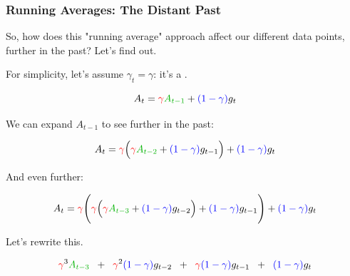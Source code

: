         \phantom{}

        \subsubsection{Running Averages: The Distant Past}

            So, how does this "running average" approach affect our different data points, further in the past? Let's find out.

            \phantom{}

            For simplicity, let's assume $\gamma_t=\gamma$: it's a .

            \begin{equation}
                A_t 
                =
                \red{\gamma} \grn{A_{t-1}}
                + 
                \blu{(1-\gamma)} g_{t}
            \end{equation}

            We can expand $A_{t-1}$ to see further in the past:

            \begin{equation}
                A_t 
                =
                \red{\gamma} 
                    \Big(\red{\gamma} \grn{A_{t-2}}
                    + 
                    \blu{(1-\gamma)} g_{t-1}
                \Big)
                + 
                \blu{(1-\gamma)} g_{t}
            \end{equation}

            And even further: 
            

            \begin{equation}
                A_t 
                =
                \red{\gamma} 
                \Bigg(\red{\gamma} 
                    \Big(
                        \red{\gamma} \grn{A_{t-3}}
                        + 
                        \blu{(1-\gamma)} g_{t-2}
                    \Big)
                    + 
                    \blu{(1-\gamma)} g_{t-1}
                \Bigg)
                + 
                \blu{(1-\gamma)} g_{t}
            \end{equation}

            Let's rewrite this.

            \begin{equation}
                \red{\gamma}^3 \grn{A_{t-3}}  \;\;+\;\; 
                \red{\gamma}^2\blu{(1-\gamma)} g_{t-2} \;\;+\;\;
                \red{\gamma}\blu{(1-\gamma)} g_{t-1} \;\;+\;\; 
                \blu{(1-\gamma)} g_{t}
            \end{equation}

